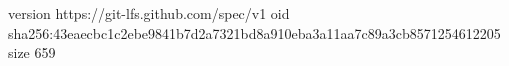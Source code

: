 version https://git-lfs.github.com/spec/v1
oid sha256:43eaecbc1c2ebe9841b7d2a7321bd8a910eba3a11aa7c89a3cb8571254612205
size 659
